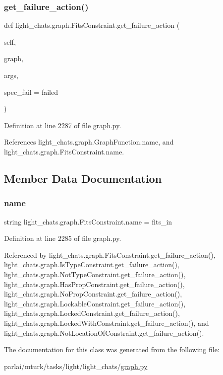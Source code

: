 \subsubsection{\texorpdfstring{get\+\_\+failure\+\_\+action()}{get\_failure\_action()}}
{\footnotesize\ttfamily def light\+\_\+chats.\+graph.\+Fits\+Constraint.\+get\+\_\+failure\+\_\+action (\begin{DoxyParamCaption}\item[{}]{self,  }\item[{}]{graph,  }\item[{}]{args,  }\item[{}]{spec\+\_\+fail = {\ttfamily \textquotesingle{}failed\textquotesingle{}} }\end{DoxyParamCaption})}



Definition at line 2287 of file graph.\+py.



References light\+\_\+chats.\+graph.\+Graph\+Function.\+name, and light\+\_\+chats.\+graph.\+Fits\+Constraint.\+name.



\subsection{Member Data Documentation}
\mbox{\label{classlight__chats_1_1graph_1_1FitsConstraint_a46dead4a9aedc70bec6fffed3b83c7d1}} 
\subsubsection{\texorpdfstring{name}{name}}
{\footnotesize\ttfamily string light\+\_\+chats.\+graph.\+Fits\+Constraint.\+name = \textquotesingle{}fits\+\_\+in\textquotesingle{}\hspace{0.3cm}{\ttfamily [static]}}



Definition at line 2285 of file graph.\+py.



Referenced by light\+\_\+chats.\+graph.\+Fits\+Constraint.\+get\+\_\+failure\+\_\+action(), light\+\_\+chats.\+graph.\+Is\+Type\+Constraint.\+get\+\_\+failure\+\_\+action(), light\+\_\+chats.\+graph.\+Not\+Type\+Constraint.\+get\+\_\+failure\+\_\+action(), light\+\_\+chats.\+graph.\+Has\+Prop\+Constraint.\+get\+\_\+failure\+\_\+action(), light\+\_\+chats.\+graph.\+No\+Prop\+Constraint.\+get\+\_\+failure\+\_\+action(), light\+\_\+chats.\+graph.\+Lockable\+Constraint.\+get\+\_\+failure\+\_\+action(), light\+\_\+chats.\+graph.\+Locked\+Constraint.\+get\+\_\+failure\+\_\+action(), light\+\_\+chats.\+graph.\+Locked\+With\+Constraint.\+get\+\_\+failure\+\_\+action(), and light\+\_\+chats.\+graph.\+Not\+Location\+Of\+Constraint.\+get\+\_\+failure\+\_\+action().



The documentation for this class was generated from the following file\+:\begin{DoxyCompactItemize}
\item 
parlai/mturk/tasks/light/light\+\_\+chats/\hyperlink{parlai_2mturk_2tasks_2light_2light__chats_2graph_8py}{graph.\+py}\end{DoxyCompactItemize}
